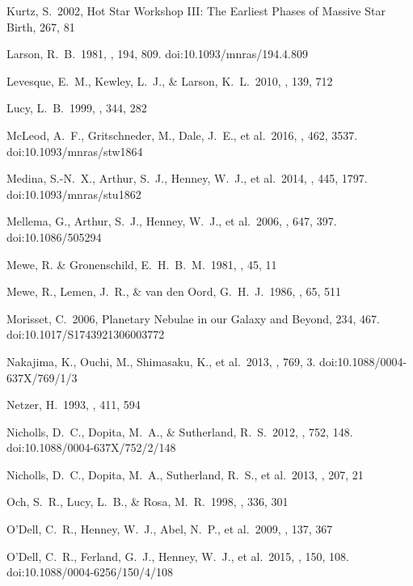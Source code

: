 \documentclass[twocolumn]{aastex62}
\begin{document}
\begin{CJK*}{UTF8}{gbsn}
\begin{thebibliography}{}
 Kurtz, S.\ 2002, Hot Star Workshop III: The Earliest Phases of Massive Star Birth, 267, 81

 Larson, R.~B.\ 1981, \mnras, 194, 809. doi:10.1093/mnras/194.4.809

 Levesque, E.~M., Kewley, L.~J., \& Larson, K.~L.\ 2010, \aj, 139, 712

 Lucy, L.~B.\ 1999, \aap, 344, 282

 McLeod, A.~F., Gritschneder, M., Dale, J.~E., et al.\ 2016, \mnras, 462, 3537. doi:10.1093/mnras/stw1864

 Medina, S.-N.~X., Arthur, S.~J., Henney, W.~J., et al.\ 2014, \mnras, 445, 1797. doi:10.1093/mnras/stu1862

 Mellema, G., Arthur, S.~J., Henney, W.~J., et al.\ 2006, \apj, 647, 397. doi:10.1086/505294

 Mewe, R. \& Gronenschild, E.~H.~B.~M.\ 1981, \aaps, 45, 11

 Mewe, R., Lemen, J.~R., \& van den Oord, G.~H.~J.\ 1986, \aaps, 65, 511

 Morisset, C.\ 2006, Planetary Nebulae in our Galaxy and Beyond, 234, 467. doi:10.1017/S1743921306003772

 Nakajima, K., Ouchi, M., Shimasaku, K., et al.\ 2013, \apj, 769, 3. doi:10.1088/0004-637X/769/1/3

 Netzer, H.\ 1993, \apj, 411, 594

 Nicholls, D.~C., Dopita, M.~A., \& Sutherland, R.~S.\ 2012, \apj, 752, 148. doi:10.1088/0004-637X/752/2/148

 Nicholls, D.~C., Dopita, M.~A., Sutherland, R.~S., et al.\ 2013, \apjs, 207, 21

 Och, S.~R., Lucy, L.~B., \& Rosa, M.~R.\ 1998, \aap, 336, 301

 O'Dell, C.~R., Henney, W.~J., Abel, N.~P., et al.\ 2009, \aj, 137, 367

 O'Dell, C.~R., Ferland, G.~J., Henney, W.~J., et al.\ 2015, \aj, 150, 108. doi:10.1088/0004-6256/150/4/108


\end{thebibliography}
\end{CJK*}
\end{document}
